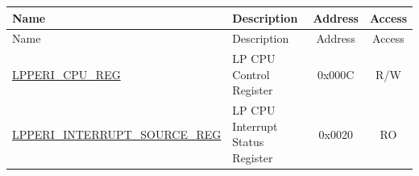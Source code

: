 \begin{longtable}{ | p{6.0cm} | p{6.4cm} | c | c| }
\hline\rowcolor{lightgray}
Name & Description & Address & Access \\ \hline
\endfirsthead
\hline
\rowcolor{lightgray}
Name & Description & Address & Access  \\
\hline
\endhead
\endfoot
\hyperref[regdesc:LPPERICPUREG]{LPPERI\_CPU\_REG} & LP CPU Control Register & 0x000C & R/W \\\hline
\hyperref[regdesc:LPPERIINTERRUPTSOURCEREG]{LPPERI\_INTERRUPT\_SOURCE\_REG} & LP CPU Interrupt Status Register & 0x0020 & RO \\\hline

\end{longtable}
